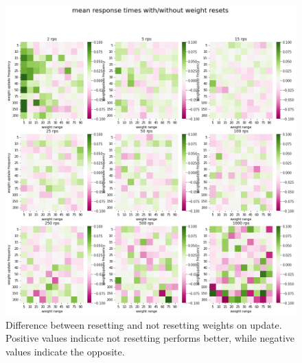 \documentclass[draft,final]{vutinfth} %
\begin{document}
\begin{figure}
    \centering
    \includegraphics[width=14cm]{graphics/graphs/lb_hyper_weight_reset_delta.png}
    \caption{Difference between resetting and not resetting weights on update. Positive values indicate not resetting performs better, while negative values indicate the opposite.}
    \label{fig:lb_hyper_reset_delta}
\end{figure}
\end{document}
